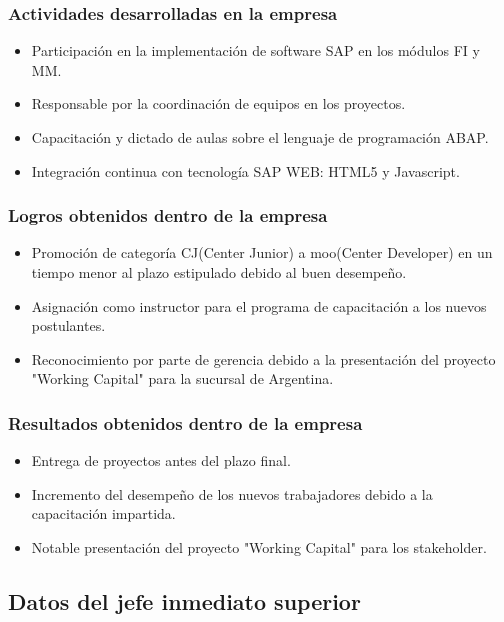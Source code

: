 \subsubsection{Actividades desarrolladas en la empresa}

\begin{itemize} 
	\item Participación en la implementación de software SAP en los módulos FI y MM.
	\item Responsable por la coordinación de equipos en los proyectos.
	\item Capacitación y dictado de aulas sobre el lenguaje de programación ABAP.
	\item Integración continua con tecnología SAP WEB: HTML5 y Javascript.
\end{itemize} 


\subsubsection{Logros obtenidos dentro de la empresa} 

\begin{itemize} 
	\item Promoción de categoría CJ(Center Junior) a moo(Center Developer) en un tiempo menor al plazo estipulado debido al buen desempeño.
	\item Asignación como instructor para el programa de capacitación a los nuevos postulantes.
	\item Reconocimiento por parte de gerencia debido a la presentación del proyecto "Working Capital" para la sucursal de Argentina.	
\end{itemize} 

\subsubsection{Resultados obtenidos dentro de la empresa} 
\begin{itemize} 
	\item Entrega de proyectos antes del plazo final.
	\item Incremento del desempeño de los nuevos trabajadores debido a la capacitación impartida.
	\item Notable presentación del proyecto "Working Capital" para los stakeholder.	
\end{itemize} 

\subsection{Datos del jefe inmediato superior}


